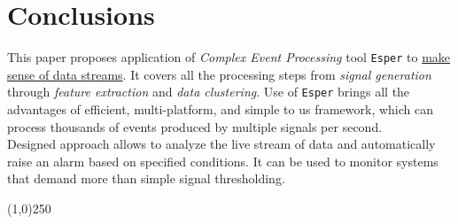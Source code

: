\documentclass[11pt, letterpaper]{article}            %
\begin{document}
\section{Conclusions}
This paper proposes application of \emph{Complex Event Processing} tool \texttt{Esper} to \underline{make sense of data streams}. It covers all the processing steps from \emph{signal generation} through \emph{feature extraction} and \emph{data clustering}. Use of \texttt{Esper} brings all the advantages of efficient, multi-platform, and simple to us framework, which can process thousands of events produced by multiple signals per second.\\

Designed approach allows to analyze the live stream of data and automatically raise an alarm based on specified conditions. It can be used to monitor systems that demand more than simple signal thresholding.\\



\begin{center} \noindent \line(1,0){250} \end{center}       %


\newpage                                                                 %
{}

\end{document}
